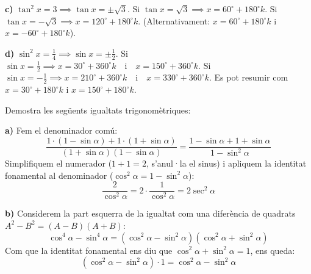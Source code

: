 \documentclass[12pt,a4paper,answers]{exam} %
\begin{document}
\begin{questions}
\begin{solution}
        \textbf{c)} $\tan^2 x = 3 \implies \tan x = \pm\sqrt{3}$.
        Si $\tan x = \sqrt{3} \implies x = 60^\circ + 180^\circ k$.
        Si $\tan x = -\sqrt{3} \implies x = 120^\circ + 180^\circ k$.
        (Alternativament: $x = 60^\circ + 180^\circ k$ i $x = -60^\circ + 180^\circ k$).
        
        \textbf{d)} $\sin^2 x = \frac{1}{4} \implies \sin x = \pm\frac{1}{2}$.
        Si $\sin x = \frac{1}{2} \implies x = 30^\circ + 360^\circ k \quad \text{i} \quad x = 150^\circ + 360^\circ k$.
        Si $\sin x = -\frac{1}{2} \implies x = 210^\circ + 360^\circ k \quad \text{i} \quad x = 330^\circ + 360^\circ k$.
        Es pot resumir com $x = 30^\circ + 180^\circ k$ i $x = 150^\circ + 180^\circ k$.
    \end{solution}

    \question Demostra les següents igualtats trigonomètriques:

    \begin{solution}
        \textbf{a)} Fem el denominador comú:
        \[ \frac{1 \cdot (1-\sin\alpha) + 1 \cdot (1+\sin\alpha)}{(1+\sin\alpha)(1-\sin\alpha)} = \frac{1 - \sin\alpha + 1 + \sin\alpha}{1 - \sin^2\alpha} \]
        Simplifiquem el numerador ($1+1=2$, s'anul·la el sinus) i apliquem la identitat fonamental al denominador ($\cos^2\alpha = 1 - \sin^2\alpha$):
        \[ \frac{2}{\cos^2\alpha} = 2 \cdot \frac{1}{\cos^2\alpha} = 2\sec^2\alpha \]
        
        \textbf{b)} Considerem la part esquerra de la igualtat com una diferència de quadrats $A^2 - B^2 = (A-B)(A+B)$:
        \[ \cos^4\alpha - \sin^4\alpha = (\cos^2\alpha - \sin^2\alpha)(\cos^2\alpha + \sin^2\alpha) \]
        Com que la identitat fonamental ens diu que $\cos^2\alpha + \sin^2\alpha = 1$, ens queda:
        \[ (\cos^2\alpha - \sin^2\alpha) \cdot 1 = \cos^2\alpha - \sin^2\alpha \]
    \end{solution}


\end{questions}
\end{document}
